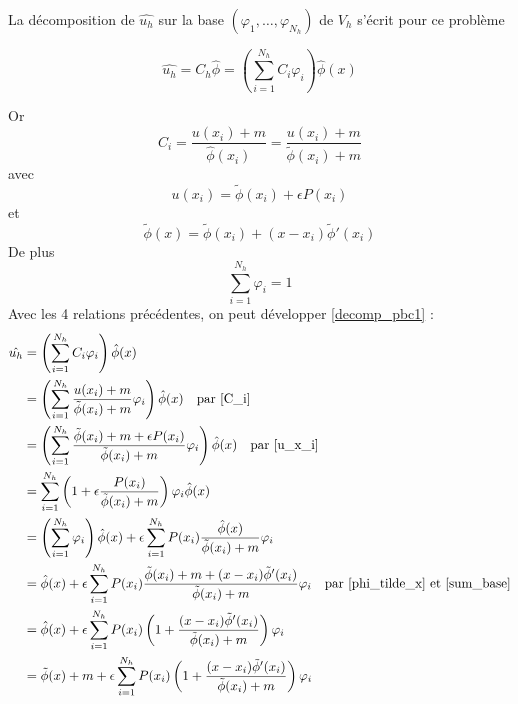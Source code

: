 \documentclass[french]{article}
\begin{document}
	La décomposition de $\hat{u_h}$ sur la base $(\varphi_1,\dots,\varphi_{N_h})$ de $V_h$ s'écrit pour ce problème
	
	\begin{equation}
		\hat{u_h}=C_h\hat{\phi}=\left(\sum_{i=1}^{N_h}C_i\varphi_i\right)\hat{\phi}(x) \label{decomp_pbc1}
	\end{equation}

	Or 
	\begin{equation}
		C_i=\frac{u(x_i)+m}{\hat{\phi}(x_i)}=\frac{u(x_i)+m}{\tilde{\phi}(x_i)+m} \label{C_i}
	\end{equation}
	avec
	\begin{equation}
		u(x_i)=\tilde{\phi}(x_i)+\epsilon P(x_i) \label{u_x_i}
	\end{equation}
	et
	\begin{equation}
		\tilde{\phi}(x)=\tilde{\phi}(x_i)+(x-x_i)\tilde{\phi}'(x_i) \label{phi_tilde_x}
	\end{equation}
	De plus
	\begin{equation}
		\sum_{i=1}^{N_h}\varphi_i=1 \label{sum_base}
	\end{equation}
	Avec les 4 relations précédentes, on peut développer \ref{decomp_pbc1} :
	\begin{align*}
		\hat{u_h}&=\left(\sum_{i=1}^{N_h}C_i\varphi_i\right)\hat{\phi}(x) \\
		&=\left(\sum_{i=1}^{N_h}\frac{u(x_i)+m}{\tilde{\phi}(x_i)+m}\varphi_i\right)\hat{\phi}(x) \quad \text{par \ref{C_i}} \\
		&=\left(\sum_{i=1}^{N_h}\frac{\tilde{\phi}(x_i)+m+\epsilon P(x_i)}{\tilde{\phi}(x_i)+m}\varphi_i\right)\hat{\phi}(x) \quad \text{par \ref{u_x_i}} \\
		&=\sum_{i=1}^{N_h}\left(1+\epsilon\frac{ P(x_i)}{\tilde{\phi}(x_i)+m}\right)\varphi_i\hat{\phi}(x) \\
		&=\left(\sum_{i=1}^{N_h}\varphi_i\right)\hat{\phi}(x)+\epsilon\sum_{i=1}^{N_h}P(x_i)\frac{\hat{\phi}(x)}{\tilde{\phi}(x_i)+m}\varphi_i \\
		&=\hat{\phi}(x)+\epsilon\sum_{i=1}^{N_h}P(x_i)\frac{\tilde{\phi}(x_i)+m+(x-x_i)\tilde{\phi}'(x_i)}{\tilde{\phi}(x_i)+m}\varphi_i \quad \text{par \ref{phi_tilde_x} et \ref{sum_base}} \\
		&=\hat{\phi}(x)+\epsilon\sum_{i=1}^{N_h}P(x_i)\left(1+\frac{(x-x_i)\tilde{\phi}'(x_i)}{\tilde{\phi}(x_i)+m}\right)\varphi_i \\
		&=\tilde{\phi}(x)+m+\epsilon\sum_{i=1}^{N_h}P(x_i)\left(1+\frac{(x-x_i)\tilde{\phi}'(x_i)}{\tilde{\phi}(x_i)+m}\right)\varphi_i \\
	\end{align*}
\end{document}
